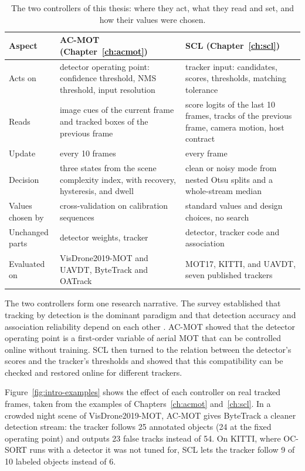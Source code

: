 \begin{table}[tbp]
\centering
\caption{The two controllers of this thesis: where they act, what they read and set, and how their values were chosen.}
\label{tab:intro-controllers}
\begin{tabular}{>{\raggedright\arraybackslash}p{2.9cm}>{\raggedright\arraybackslash}p{5.5cm}>{\raggedright\arraybackslash}p{5.5cm}}
\toprule
Aspect & AC-MOT (Chapter~\ref{ch:acmot}) & SCL (Chapter~\ref{ch:scl})\\
\midrule
Acts on & detector operating point: confidence threshold, NMS threshold, input resolution & tracker input: candidates, scores, thresholds, matching tolerance\\
Reads & image cues of the current frame and tracked boxes of the previous frame & score logits of the last 10 frames, tracks of the previous frame, camera motion, host contract\\
Update & every 10 frames & every frame\\
Decision & three states from the scene complexity index, with recovery, hysteresis, and dwell & clean or noisy mode from nested Otsu splits and a whole-stream median\\
Values chosen by & cross-validation on calibration sequences & standard values and design choices, no search\\
Unchanged parts & detector weights, tracker & detector, tracker code and association\\
Evaluated on & VisDrone2019-MOT and UAVDT, ByteTrack and OATrack & MOT17, KITTI, and UAVDT, seven published trackers\\
\bottomrule
\end{tabular}
\end{table}

The two controllers form one research narrative. The survey established that tracking by detection is the dominant paradigm and that detection accuracy and association reliability depend on each other \cite{ismail2026realtime}. AC-MOT showed that the detector operating point is a first-order variable of aerial MOT that can be controlled online without training. SCL then turned to the relation between the detector's scores and the tracker's thresholds and showed that this compatibility can be checked and restored online for different trackers.

Figure~\ref{fig:intro-examples} shows the effect of each controller on real tracked frames, taken from the examples of Chapters~\ref{ch:acmot} and~\ref{ch:scl}. In a crowded night scene of VisDrone2019-MOT, AC-MOT gives ByteTrack a cleaner detection stream: the tracker follows 25 annotated objects (24 at the fixed operating point) and outputs 23 false tracks instead of 54. On KITTI, where OC-SORT runs with a detector it was not tuned for, SCL lets the tracker follow 9 of 10 labeled objects instead of 6.

